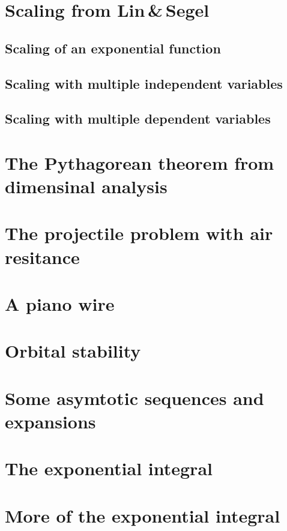 \documentclass[11pt,letter, swedish, english
]{article}
\begin{document}
\section{Scaling from Lin\,\&\,Segel}
\setcounter{subsection}{1}

\subsection{Scaling of an exponential function}

\subsection{Scaling with multiple independent variables}

\subsection{Scaling with multiple dependent variables}




\renewcommand{\thesubsection}{\arabic{section} (\alph{subsection})}
\renewcommand{\thesubsubsection}{\arabic{section} (\alph{subsection},\,\roman{subsubsection})}

\section{The Pythagorean theorem from dimensinal analysis}


\section{The projectile problem with air resitance}


\section{A piano wire}


\section{Orbital stability }


\section{Some asymtotic sequences and expansions}


\section{The exponential integral}


\section{More of the exponential integral}
\end{document}
